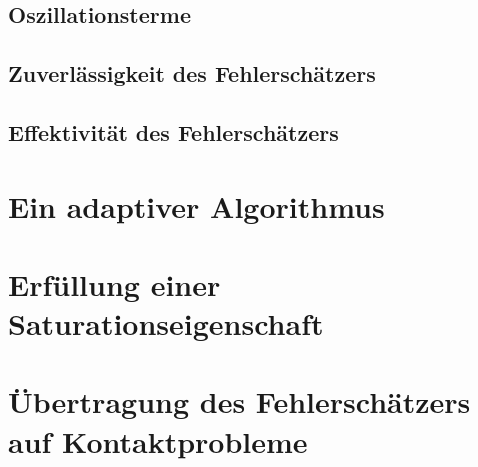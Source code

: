 \subsection{Oszillationsterme}
\label{kap:4.1.3}



\subsection{Zuverlässigkeit des Fehlerschätzers}
\label{kap:4.1.4}



\subsection{Effektivität des Fehlerschätzers}
\label{kap:4.1.5}



\section{Ein adaptiver Algorithmus}
\label{kap:4.2}



\section{Erfüllung einer Saturationseigenschaft}
\label{kap:4.3}



\section{Übertragung des Fehlerschätzers auf Kontaktprobleme}
\label{kap:4.4}


\newpage

